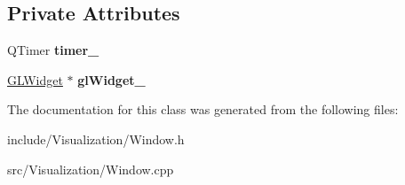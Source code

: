 \subsection*{Private Attributes}
\begin{DoxyCompactItemize}
\item 
\hypertarget{class_my_window_a42ef11e52721811070d715142a9f2b04}{Q\-Timer {\bfseries timer\-\_\-}}\label{class_my_window_a42ef11e52721811070d715142a9f2b04}

\item 
\hypertarget{class_my_window_a82841f4322a0a0975d71ad021bd4a0df}{\hyperlink{class_g_l_widget}{G\-L\-Widget} $\ast$ {\bfseries gl\-Widget\-\_\-}}\label{class_my_window_a82841f4322a0a0975d71ad021bd4a0df}

\end{DoxyCompactItemize}


The documentation for this class was generated from the following files\-:\begin{DoxyCompactItemize}
\item 
include/\-Visualization/Window.\-h\item 
src/\-Visualization/Window.\-cpp\end{DoxyCompactItemize}
